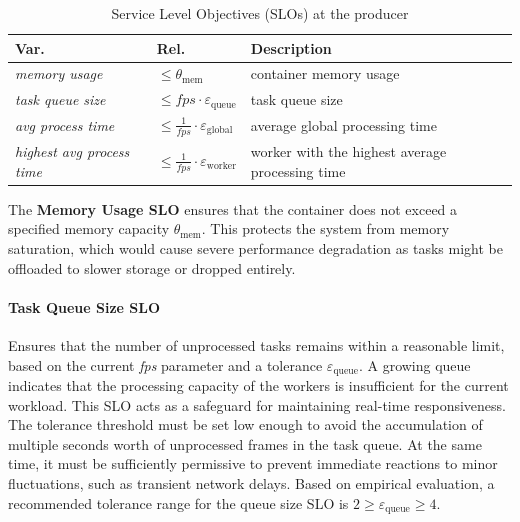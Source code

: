 \begin{table}[h]
    \centering
    \begin{tabular}{@{}lll@{}}
        \toprule
        \textbf{Var.} & \textbf{Rel.} & \textbf{Description} \\
        \midrule
        \textit{memory usage} 
            & \( \leq \theta_\text{mem} \) 
            & container memory usage \\
            
        \textit{task queue size} 
            & \( \leq \textit{fps} \cdot \varepsilon_\text{queue} \) 
            & task queue size \\
            
        \textit{avg process time} 
            & \( \leq \frac{1}{\textit{fps}} \cdot \varepsilon_\text{global}\) 
            & average global processing time \\
            
        \textit{highest avg process time} 
            & \( \leq \frac{1}{\textit{fps}} \cdot \varepsilon_\text{worker}\) 
            & worker with the highest average processing time \\
        \bottomrule
    \end{tabular}
    \caption{Service Level Objectives (SLOs) at the producer}
    \label{tab:slo-table}
\end{table}


The \textbf{Memory Usage SLO} ensures that the container does not exceed a specified memory capacity \(\theta_\text{mem}\). This protects the system from memory saturation, which would cause severe performance degradation as tasks might be offloaded to slower storage or dropped entirely.

\paragraph{Task Queue Size SLO}
Ensures that the number of unprocessed tasks remains within a reasonable limit, based on the current \textit{fps} parameter and a tolerance \(\varepsilon_\text{queue}\). A growing queue indicates that the processing capacity of the workers is insufficient for the current workload. This SLO acts as a safeguard for maintaining real-time responsiveness. The tolerance threshold must be set low enough to avoid the accumulation of multiple seconds worth of unprocessed frames in the task queue. At the same time, it must be sufficiently permissive to prevent immediate reactions to minor fluctuations, such as transient network delays. Based on empirical evaluation, a recommended tolerance range for the queue size SLO is \( 2 \geq \varepsilon_\text{queue} \geq 4\).

